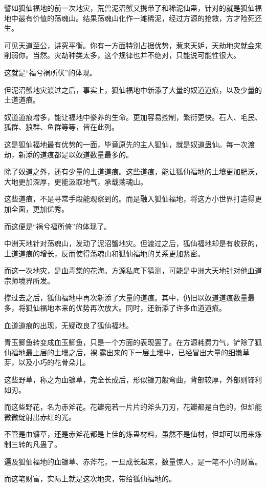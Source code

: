 \begin{this_body}
譬如狐仙福地的前一次地灾，荒兽泥沼蟹又携带了和稀泥仙蛊，针对的就是狐仙福地中最有价值的荡魂山。结果荡魂山化作一滩稀泥，经过方源的抢救，方才险死还生。

可见天道至公，讲究平衡。你有一方面特别占据优势，惹来天妒，天劫地灾就会来削弱你。当然。灾劫种类太多，这个规律也并不绝对，只能说可能性很大。

这就是“福兮祸所伏”的体现。

但泥沼蟹地灾渡过之后，事实上，狐仙福地中新添了大量的奴道道痕，以及少量的土道道痕。

奴道道痕增多，能让福地中豢养的生命。更加容易控制，繁衍更快。石人、毛民、狐群、狼群、鱼群等等，皆在此列。

这是狐仙福地最有优势的一面，毕竟原先的主人狐仙，就是奴道蛊仙。每一次渡劫，新添的道痕都是以奴道数量最多的。

除了奴道之外，还有少量的土道道痕。这些道痕，能让狐仙福地的土壤更加肥沃，大地更加深厚，更能汲取地气，承载荡魂山。

这些道痕，不是寻常手段能观察到的。而是融入狐仙福地，将这方小世界打造得更加全面，更加优秀。

而这便是“祸兮福所倚”的体现了。

中洲天地针对荡魂山，发动了泥沼蟹地灾。但渡过之后，狐仙福地却是有收获的，土道道痕的增长，反而使得荡魂山和狐仙福地的关系更加紧密。

而这一次地灾，是血毒棠的花海。方源私底下猜测，可能是中洲大天地针对他血道宗师境界所发。

撑过去之后，狐仙福地中再次新添了大量的道痕。其中，仍旧以奴道道痕数量最多，将狐仙福地本来的优势再次放大。同时，还新添了许多血道道痕。

血道道痕的出现，无疑改良了狐仙福地。

青玉鲫鱼转变成血玉鲫鱼，只是一个方面的表现罢了。在方源耗费力气，铲除了狐仙福地最上层的土壤之后，裸.露出来的下一层土壤中，已经冒出大量的细嫩草芽，以及小巧的花骨朵儿。

这些野草，称之为血镰草，完全长成后，形似镰刀般弯曲，背部较厚，外部则锋利如刃。

而这些野花，名为赤斧花。花瓣宛若一片片的斧头刀刃，花瓣都是白色的，但却能微微绽射出赤红的光。

不管是血镰草，还是赤斧花都是上佳的炼蛊材料，虽然不是仙材，但却可以用来炼制三转的凡蛊了。

遍及狐仙福地的血镰草、赤斧花，一旦成长起来，数量惊人，是一笔不小的财富。

而这笔财富，实际上就是这次地灾，带给狐仙福地的。


\end{this_body}
